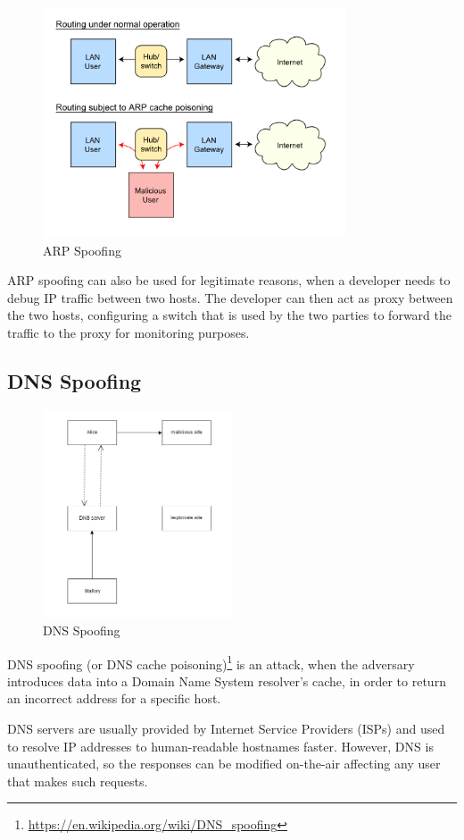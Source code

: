 \begin{figure}[H] \caption{ARP Spoofing} \centering
\includegraphics[width=0.8\textwidth]{diagrams/arp_spoofing.png}\end{figure}

ARP spoofing can also be used for legitimate reasons, when a developer needs to
debug IP traffic between two hosts. The developer can then act as proxy between
the two hosts, configuring a switch that is used by the two parties to forward
the traffic to the proxy for monitoring purposes.

\subsection{DNS Spoofing}

\begin{figure}[H] \caption{DNS Spoofing} \centering
\includegraphics[width=0.5\textwidth]{diagrams/dns_spoofing.png}\end{figure}

DNS spoofing (or DNS cache
poisoning)\footnote{\url{https://en.wikipedia.org/wiki/DNS_spoofing}} is an
attack, when the adversary introduces data into a Domain Name System resolver's
cache, in order to return an incorrect address for a specific host.

DNS servers are usually provided by Internet Service Providers (ISPs) and used
to resolve IP addresses to human-readable hostnames faster. However, DNS is
unauthenticated, so the responses can be modified on-the-air affecting any user
that makes such requests.
